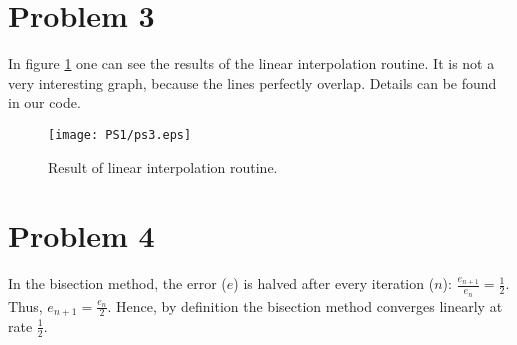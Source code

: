 \documentclass[12pt]{article}
\newcommand{\?}{\stackrel{?}{=}}
\begin{document}
\section*{Problem 3}
In figure \ref{fig:lin_int} one can see the results of the linear interpolation routine. It is not a very interesting graph, because the lines perfectly overlap. Details can be found in our code.

\begin{figure}[htbp!]
    \centering
    \texttt{[image: PS1/ps3.eps]}
    \caption{Result of linear interpolation routine.}
    \label{fig:lin_int}
\end{figure}


\section*{Problem 4}

In the bisection method, the error ($e$) is halved after every iteration ($n$): $\frac{e_{n+1}}{e_n} = \frac{1}{2}$. Thus, $e_{n+1} = \frac{e_n}{2}$. Hence, by definition the bisection method converges linearly at rate $\frac{1}{2}$.
\end{document}
